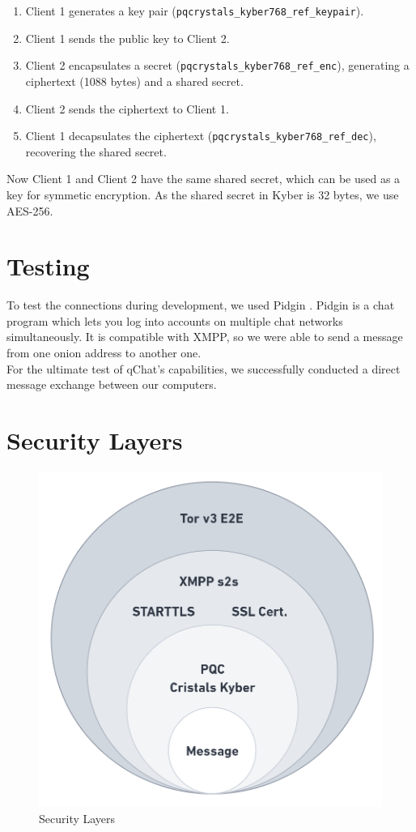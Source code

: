 \begin{enumerate}
	\item Client 1 generates a key pair (\texttt{pqcrystals\_kyber768\_ref\_keypair}).
	\item Client 1 sends the public key to Client 2.
	\item Client 2 encapsulates a secret (\texttt{pqcrystals\_kyber768\_ref\_enc}), generating a ciphertext (1088 bytes) and a shared secret.
	\item Client 2 sends the ciphertext to Client 1.
	\item Client 1 decapsulates the ciphertext (\texttt{pqcrystals\_kyber768\_ref\_dec}), recovering the shared secret.
\end{enumerate}

Now Client 1 and Client 2 have the same shared secret, which can be used as a key for symmetic encryption. As the shared secret in Kyber is 32 bytes, we use AES-256.\\



\section{Testing}
To test the connections during development, we used Pidgin \cite{pidginwebsite2023}. Pidgin is a chat program which lets you log into accounts on multiple chat networks simultaneously. It is compatible with XMPP, so we were able to send a message from one onion address to another one.\\

For the ultimate test of qChat's capabilities, we successfully conducted a direct message exchange between our computers.

\section {Security Layers}


\begin{figure}[H]
	\centering
	\includegraphics[width=0.7\linewidth]{resources/securitylayers.png}
	\caption{Security Layers}
	\label{fig:securitylayers}
\end{figure}

